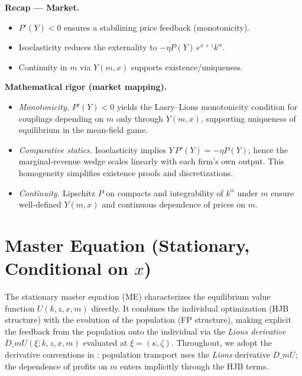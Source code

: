 \documentclass[11pt,letterpaper,oneside]{article}
\numberwithin{equation}{section}
\newcommand{\1}{\mathbf{1}}
\newcommand{\dmU}{D\_m U}
\newcommand{\Dm}{D\_m}
\begin{document}
\begin{tcolorbox}[didacticstyle]
\textbf{Recap --- Market.}
\begin{itemize}[leftmargin=1.15em,itemsep=0.2em]
  \item $P'(Y)<0$ ensures a stabilizing price feedback (monotonicity).
  \item Isoelasticity reduces the externality to $-\eta P(Y)\,e^{x+z}k^\alpha$.
  \item Continuity in $m$ via $Y(m,x)$ supports existence/uniqueness.
\end{itemize}
\end{tcolorbox}

\begin{tcolorbox}[mathstyle]
\textbf{Mathematical rigor (market mapping).}
\begin{itemize}[leftmargin=1.15em,itemsep=0.25em]
  \item \emph{Monotonicity.} $P'(Y)<0$ yields the Lasry--Lions monotonicity condition for couplings depending on $m$ only through $Y(m,x)$, supporting uniqueness of equilibrium in the mean-field game.
  \item \emph{Comparative statics.} Isoelasticity implies $Y\,P'(Y)=-\eta P(Y)$; hence the marginal-revenue wedge scales linearly with each firm's own output. This homogeneity simplifies existence proofs and discretizations.
  \item \emph{Continuity.} Lipschitz $P$ on compacts and integrability of $k^\alpha$ under $m$ ensure well-defined $Y(m,x)$ and continuous dependence of prices on $m$.
\end{itemize}
\end{tcolorbox}

\section[Master Equation (Stationary, Conditional on x)]{Master Equation (Stationary, Conditional on $x$)}\label{sec:master-equation}
The stationary master equation (ME) characterizes the equilibrium value function $U(k,z,x,m)$ directly. It combines the individual optimization (HJB structure) with the evolution of the population (FP structure), making explicit the feedback from the population onto the individual via the \emph{Lions derivative} $\dmU(\xi;k,z,x,m)$ evaluated at $\xi=(\kappa,\zeta)$. Throughout, we adopt the derivative conventions in : population transport uses the \emph{Lions} derivative $\Dm U$; the dependence of profits on $m$ enters implicitly through the HJB terms.
\end{document}
